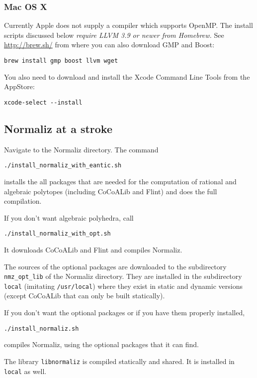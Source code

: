 \documentclass[12pt,a4paper]{scrartcl}
\theoremstyle{definition}
\begin{document}
\subsubsection{Mac OS X}\label{mac}

Currently Apple does not supply a compiler which supports OpenMP.
The install scripts discussed below \emph{require LLVM 3.9 or newer from Homebrew.} See
\url{http://brew.sh/} from where you can also download GMP and Boost:

\begin{Verbatim}
brew install gmp boost llvm wget
\end{Verbatim}

You also need to download and install the Xcode Command Line Tools from the AppStore:
\begin{Verbatim}
xcode-select --install
\end{Verbatim} 

\subsection{Normaliz at a stroke}\label{stroke}

Navigate to the Normaliz directory. The command
\begin{Verbatim}
./install_normaliz_with_eantic.sh
\end{Verbatim}
installs the all packages that are needed for the computation of rational and algebraic polytopes (including CoCoALib and Flint) and does the full compilation.

If you don't want algebraic polyhedra, call
\begin{Verbatim}
./install_normaliz_with_opt.sh
\end{Verbatim}
It downloads CoCoALib and Flint and compiles Normaliz.

The sources of the optional packages are downloaded to the subdirectory \verb|nmz_opt_lib| of the Normaliz directory. They are installed in the subdirectory \verb|local| (imitating \verb|/usr/local|) where they exist in static and dynamic versions (except CoCoALib that can only be built statically).

If you don't want the optional packages or if you have them properly installed,
\begin{Verbatim}
./install_normaliz.sh
\end{Verbatim}
compiles Normaliz, using the optional packages that it can find. 

The library \verb|libnormaliz| is compiled statically and shared. It is installed in \verb|local| as well. 
\end{document}
